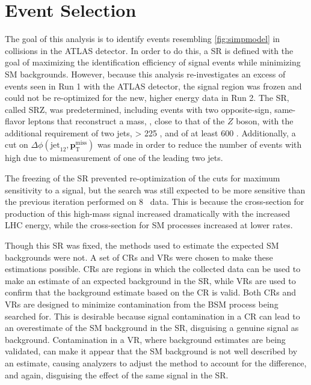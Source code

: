 
\chapter{Event Selection} %
\label{ch:eventsel} 

The goal of this analysis is to identify events resembling \autoref{fig:simpmodel} in collisions in the \ac{ATLAS} detector. In order to do this, a \acf{SR} is defined with the goal of maximizing the identification efficiency of signal events while minimizing \ac{SM} backgrounds. However, because this analysis re-investigates an excess of events seen in Run 1 with the \ac{ATLAS} detector, the signal region was frozen and could not be re-optimized for the new, higher energy data in Run 2. The \ac{SR}, called SRZ, was predetermined, including events with two opposite-sign, same-flavor leptons that reconstruct a mass, \mll, close to that of the $Z$ boson, with the additional requirement of two jets, \met > 225 \gev, and \HT of at least 600 \gev. Additionally, a cut on $\Delta\phi(\text{jet}_{12},{\boldsymbol p}_{\mathrm{T}}^{\mathrm{miss}})$ was made in order to reduce the number of events with high \met due to mismeasurement of one of the leading two jets. 

The freezing of the \ac{SR} prevented re-optimization of the cuts for maximum sensitivity to a signal, but the search was still expected to be more sensitive than the previous iteration performed on 8 \tev~data. This is because the cross-section for production of this high-mass signal increased dramatically with the increased \ac{LHC} energy, while the cross-section for \ac{SM} processes increased at lower rates.

Though this \ac{SR} was fixed, the methods used to estimate the expected \ac{SM} backgrounds were not. A set of \acfp{CR} and \acfp{VR} were chosen to make these estimations possible. \acp{CR} are regions in which the collected data can be used to make an estimate of an expected background in the \ac{SR}, while \acp{VR} are used to confirm that the background estimate based on the \ac{CR} is valid. Both \acp{CR} and \acp{VR} are designed to minimize contamination from the \ac{BSM} process being searched for. This is desirable because signal contamination in a \ac{CR} can lead to an overestimate of the \ac{SM} background in the \ac{SR}, disguising a genuine signal as background. Contamination in a \ac{VR}, where background estimates are being validated, can make it appear that the \ac{SM} background is not well described by an estimate, causing analyzers to adjust the method to account for the difference, and again, disguising the effect of the same signal in the \ac{SR}. 

